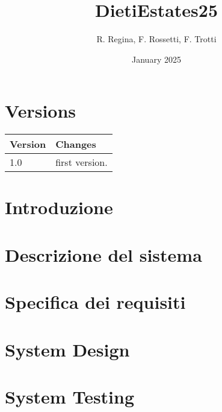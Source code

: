 \documentclass{article}
\author{R. Regina, F. Rossetti, F. Trotti}
\title{DietiEstates25}
\date{January 2025}
\begin{document}
\maketitle

\tableofcontents
\newpage

\section{Versions}
\begin{center}
\begin{tabular}{| m{8em} | m{8cm}|}
    \hline
    Version & Changes \\
    \hline
    1.0 & first version. \\
    \hline
\end{tabular}
\end{center}

\section{Introduzione}


\section{Descrizione del sistema}


\section{Specifica dei requisiti}

\section{System Design}

\section{System Testing}
\end{document}
